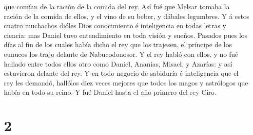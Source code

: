 que comían de la ración de la comida del rey.  Así fué
que Melsar tomaba la ración de la comida de ellos, y el vino de su
beber, y dábales legumbres.  Y á estos cuatro muchachos
dióles Dios conocimiento é inteligencia en todas letras y ciencia: mas
Daniel tuvo entendimiento en toda visión y sueños. 
Pasados pues los días al fin de los cuales había dicho el rey que los
trajesen, el príncipe de los eunucos los trajo delante de Nabucodonosor.
 Y el rey habló con ellos, y no fué hallado entre todos
ellos otro como Daniel, Ananías, Misael, y Azarías: y así estuvieron
delante del rey.  Y en todo negocio de sabiduría é
inteligencia que el rey les demandó, hallólos diez veces mejores que
todos los magos y astrólogos que había en todo su reino. 
Y fué Daniel hasta el año primero del rey Ciro.

\hypertarget{section-1}{%
\section{2}\label{section-1}}

